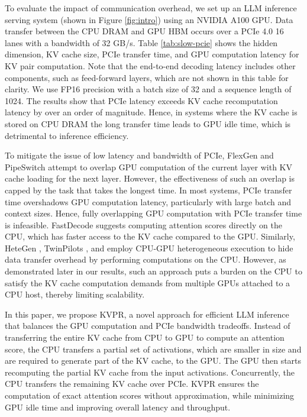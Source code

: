 \documentclass[11pt]{article}
\newcommand{\paperName}{KVPR}
\begin{document}
To evaluate the impact of communication overhead, we set up an LLM inference serving system (shown in Figure \ref{fig:intro}) using an NVIDIA A100 GPU. Data transfer between the CPU DRAM and GPU HBM occurs over a PCIe 4.0 16 lanes with a bandwidth of 32 GB/s. Table \ref{tab:slow-pcie} shows the hidden dimension, KV cache size, PCIe transfer time, and GPU computation latency for KV pair computation.  Note that the end-to-end decoding latency includes other components, such as feed-forward layers, which are not shown in this table for clarity. We use FP16 precision with a batch size of 32 and a sequence length of 1024. The results show that PCIe latency exceeds KV cache recomputation latency by over an order of magnitude. Hence, in systems where the KV cache is stored on CPU DRAM the long transfer time leads to GPU idle time, which is detrimental to inference efficiency. 

To mitigate the issue of low latency and bandwidth of PCIe, FlexGen \cite{sheng2023flexgen} and PipeSwitch \cite{bai2020pipeswitch} attempt to overlap GPU computation of the current layer with KV cache loading for the next layer. However, the effectiveness of such an overlap is capped by the task that takes the longest time. In most systems,  PCIe transfer time overshadows GPU computation latency,  particularly with large batch and context sizes. Hence, fully overlapping GPU computation with PCIe transfer time is infeasible. %
FastDecode \cite{he2024fastdecode} suggests computing attention scores directly on the CPU, which has faster access to the KV cache compared to the GPU. Similarly, HeteGen \cite{zhao2024hetegen}, TwinPilots \cite{yu2024twinpilots}, and \citeauthor{park2024improving} employ CPU-GPU heterogeneous execution to hide data transfer overhead by performing computations on the CPU. However, as demonstrated later in our results, such an approach puts a burden on the CPU to satisfy the KV cache computation demands from multiple GPUs attached to a CPU host, thereby limiting scalability.   


In this paper, we propose \paperName, a novel approach for efficient LLM inference that balances the GPU computation and PCIe bandwidth tradeoffs. Instead of transferring the entire KV cache from CPU to GPU to compute an attention score, the CPU transfers a partial set of activations, which are smaller in size and are required to generate part of the KV cache, to the GPU. The GPU then starts recomputing the partial KV cache from the input activations. Concurrently, the CPU transfers the remaining KV cache over PCIe. {\paperName} ensures the computation of exact attention scores without approximation, while minimizing GPU idle time and improving overall latency and throughput.
\end{document}
